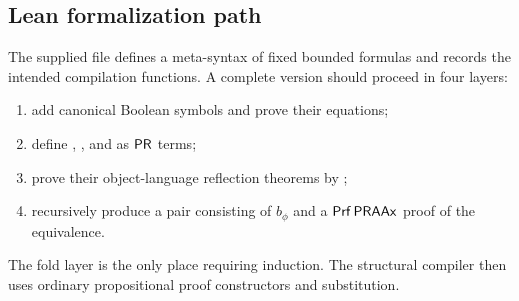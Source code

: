 \subsection{Lean formalization path}

The supplied file  defines a meta-syntax of
fixed bounded formulas and records the intended compilation functions.  A
complete version should proceed in four layers:
\begin{enumerate}
\item add canonical Boolean symbols and prove their equations;
\item define , , and  as
\(\mathsf{PR}\) terms;
\item prove their object-language reflection theorems by ;
\item recursively produce a pair consisting of \(b_\phi\) and a
\(\mathsf{Prf}\,\mathsf{PRAAx}\) proof of the equivalence.
\end{enumerate}
The fold layer is the only place requiring induction.  The structural compiler
then uses ordinary propositional proof constructors and substitution.

